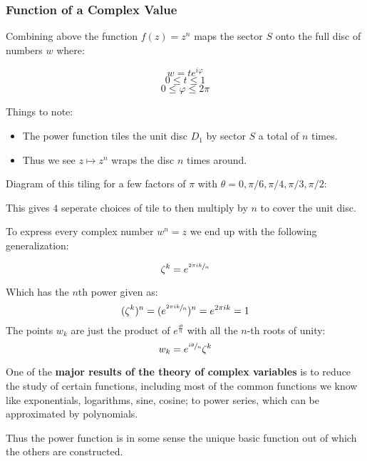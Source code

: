 \subsubsection*{Function of a Complex Value}
Combining above the function $f(z) = z^n$ maps the sector $S$ onto the full disc of numbers $w$ where:

\[w = te^{i\varphi} \]
\[0 \leq t \leq 1\]
\[0 \leq \varphi \leq 2\pi \]

Things to note:
\begin{itemize}
	\item The power function tiles the unit disc $D_1$ by sector $S$ a total of $n$ times. 
	\item Thus we see $z \mapsto z^n$ wraps the disc $n$ times around.
\end{itemize}

Diagram of this tiling for a few factors of $\pi$ with $\theta = 0, \pi/6, \pi/4, \pi/3, \pi/2$:


This gives $4$ seperate choices of tile to then multiply by $n$ to cover the unit disc.

To express every complex number $w^n = z$ we end up with the following generalization:
\begin{defn}
	\[\zeta^k = e^{\sfrac{2\pi ik}{n}}\]
\end{defn}
Which has the $n$th power given as:
\[ (\zeta^k)^n = ( e^{\sfrac{2\pi ik}{n}} )^n = e^{2\pi ik} = 1 \]
The points $w_k$ are just the product of $e^{\frac{i\theta}{n}}$ with all the $n$-th roots of unity:
\[w_k = e^{\sfrac{i\theta}{n}}\zeta^k\]

One of the \textbf{major results of the theory of complex variables} is to reduce the study of certain functions, including most of the 
common functions we know like exponentials, logarithms, sine, cosine; to power series, which can be approximated by polynomials.

Thus the power function is in some sense the unique basic function out of which the others are constructed.
\newpage